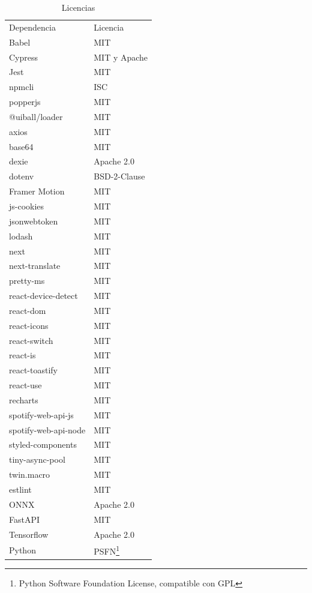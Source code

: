 \begin{table}[H]
    \centering
    \begin{tabular}{ll}
    \hline
        Dependencia & Licencia \\
         Babel & MIT \\
         Cypress & MIT y Apache \\
         Jest & MIT \\
         npmcli & ISC \\
         popperjs & MIT \\
         @uiball/loader & MIT \\
         axios & MIT \\
         base64 & MIT \\
         dexie & Apache 2.0 \\
         dotenv & BSD-2-Clause \\
         Framer Motion & MIT \\
         js-cookies & MIT \\
         jsonwebtoken & MIT \\
         lodash & MIT \\
         next & MIT \\
         next-translate & MIT \\
         pretty-ms & MIT\\
         react-device-detect & MIT \\
         react-dom & MIT \\
         react-icons & MIT \\
         react-switch & MIT \\
         react-is & MIT \\
         react-toastify & MIT \\
         react-use & MIT \\
         recharts & MIT \\
         spotify-web-api-js & MIT \\
         spotify-web-api-node & MIT \\
         styled-components & MIT \\
         tiny-async-pool & MIT \\
         twin.macro & MIT \\
         estlint & MIT \\
         ONNX & Apache 2.0 \\
         FastAPI & MIT \\
         Tensorflow & Apache 2.0 \\
         Python & PSFN\footnote{Python Software Foundation License, compatible con GPL} \\
         
         
    \hline
    \end{tabular}
    \caption{Licencias}
    \label{tab:A:Licencias}
\end{table}
